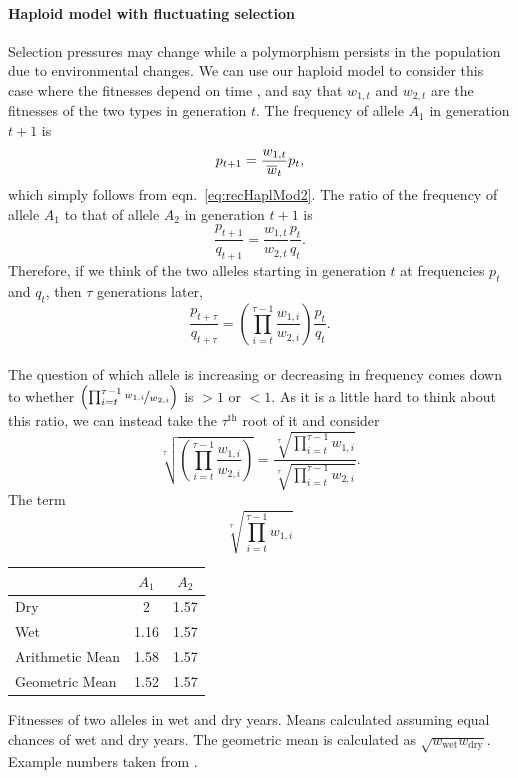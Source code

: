 \paragraph{Haploid model with fluctuating selection}
Selection pressures may change while a polymorphism persists in the population due to environmental changes. 
We can use our haploid model to consider this case where the fitnesses depend on time \citep{Dempster:55}, and
say that $w_{1,t}$ and $w_{2,t}$ are the fitnesses of the two types in
generation $t$. The frequency of allele $A_1$ in generation $t+1$ is
\begin{equation}
p_{t+1} = \frac{w_{1,t}}{\overline{w}_t} p_t,
\end{equation}
which simply follows from eqn.\ \eqref{eq:recHaplMod2}.
The ratio of the frequency of allele $A_1$ to that of allele $A_2$ in generation $t+1$ is
\begin{equation}
\frac{p_{t+1}}{q_{t+1}} = \frac{w_{1,t}}{w_{2,t}}  \frac{p_{t}}{q_{t}}.
\end{equation}
Therefore, if we think of the two alleles starting in generation $t$ at
frequencies $p_t$ and $q_t$, then $\tau$ generations later,
\begin{equation}
\frac{p_{t+\tau}}{q_{t+\tau}} = \left(\prod_{i=t}^{\tau-1} \frac{w_{1,i}}{w_{2,i}}  \right) \frac{p_{t}}{q_{t}}.
\end{equation}
\\

The question of which allele is increasing or decreasing in frequency comes down
to whether $\left(\prod_{i=t}^{\tau-1} \nicefrac{w_{1,i}}{w_{2,i}}  \right)$ is
$>1$ or $<1$. As it is a little hard to think about this ratio, we can
instead take the $\tau^{\mathrm{th}}$ root of it and consider
\begin{equation}
\sqrt[\tau]{\left(\prod_{i=t}^{\tau-1} \frac{w_{1,i}}{w_{2,i}}  \right)} = \frac{\sqrt[\tau]{\prod_{i=t}^{\tau-1}w_{1,i}}}{\sqrt[\tau]{\prod_{i=t}^{\tau-1}w_{2,i}}}.
\end{equation}
The term
\begin{equation}
  \sqrt[\tau]{\prod_{i=t}^{\tau-1}w_{1,i}}  \label{hap_geo_fitness}
\end{equation}
\begin{margintable}
  \begin{tabular}{lcc}
    & $A_1$  & $A_2$\\
    \hline
    Dry & 2 & 1.57 \\
    Wet &  1.16 & 1.57   \\
    \hline
    Arithmetic Mean & 1.58  & 1.57  \\
    Geometric Mean & 1.52 & 1.57 
  \end{tabular}
  \caption{Fitnesses of two alleles in wet and dry years. Means calculated assuming
    equal chances of wet and dry years. The geometric mean is
    calculated as
    $\sqrt{w_{\textrm{wet}}w_{\textrm{dry}}}$. Example numbers
    taken from \citet{seger1987oxford}.} \label{Table:Geom_fitness}
\end{margintable}

